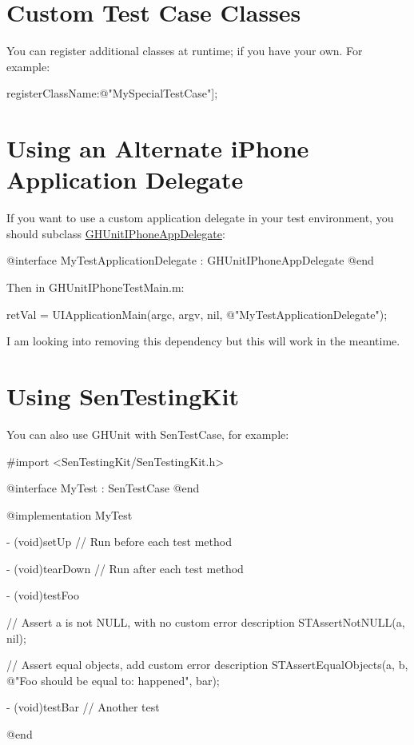 \hypertarget{_customizing_CustomTests}{}\section{\-Custom Test Case Classes}\label{_customizing_CustomTests}
\-You can register additional classes at runtime; if you have your own. \-For example\-:


\begin{DoxyCode}
 [[GHTesting sharedInstance] registerClassName:@"MySpecialTestCase"];
\end{DoxyCode}
\hypertarget{_customizing_AlternateIOSAppDelegate}{}\section{\-Using an Alternate i\-Phone Application Delegate}\label{_customizing_AlternateIOSAppDelegate}
\-If you want to use a custom application delegate in your test environment, you should subclass \hyperlink{interface_g_h_unit_i_phone_app_delegate}{\-G\-H\-Unit\-I\-Phone\-App\-Delegate}\-:


\begin{DoxyCode}
 @interface MyTestApplicationDelegate : GHUnitIPhoneAppDelegate { }
 @end
\end{DoxyCode}


\-Then in \-G\-H\-Unit\-I\-Phone\-Test\-Main.\-m\-:


\begin{DoxyCode}
 retVal = UIApplicationMain(argc, argv, nil, @"MyTestApplicationDelegate");
\end{DoxyCode}


\-I am looking into removing this dependency but this will work in the meantime.\hypertarget{_customizing_UsingSenTesting}{}\section{\-Using Sen\-Testing\-Kit}\label{_customizing_UsingSenTesting}
\-You can also use \-G\-H\-Unit with \-Sen\-Test\-Case, for example\-:


\begin{DoxyCode}
 #import <SenTestingKit/SenTestingKit.h>
 
 @interface MyTest : SenTestCase { }
 @end
 
 @implementation MyTest
 
 - (void)setUp {
   // Run before each test method
 }
 
 - (void)tearDown {
   // Run after each test method
 }
 
 - (void)testFoo {
   // Assert a is not NULL, with no custom error description
   STAssertNotNULL(a, nil);
 
   // Assert equal objects, add custom error description
   STAssertEqualObjects(a, b, @"Foo should be equal to: %
       happened", bar);
 }
 
 - (void)testBar {
   // Another test
 }
 
 @end
\end{DoxyCode}
 